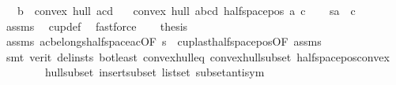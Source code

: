 \begin{isabellebody}
\ \ \ {\isachardoublequoteopen}b\ {\isasymin}\ convex\ hull\ {\isacharbraceleft}{\kern0pt}a{\isacharcomma}{\kern0pt}c{\isacharcomma}{\kern0pt}d{\isacharbraceright}{\kern0pt}{\isachardoublequoteclose}\isanewline
\ \ \ {\isachardoublequoteopen}convex\ hull\ {\isacharbraceleft}{\kern0pt}a{\isacharcomma}{\kern0pt}b{\isacharcomma}{\kern0pt}c{\isacharcomma}{\kern0pt}d{\isacharbraceright}{\kern0pt}{\isasymsubseteq}\ halfspace{\isacharunderscore}{\kern0pt}pos\ a\ c{\isachardoublequoteclose}\isanewline
%
\isadelimproof
%
\endisadelimproof
%
\isatagproof
{}\isamarkupfalse%
{\isacharminus}{\kern0pt}\isanewline
\ \ \isamarkupfalse%
\ s{\isacharunderscore}{\kern0pt}{}{\isacharcolon}{\kern0pt}{\isachardoublequoteopen}a\ {\isasymnoteq}\ c{\isachardoublequoteclose}\ \isamarkupfalse%
\ assms{\isacharparenleft}{\kern0pt}{}{\isacharparenright}{\kern0pt}\ \isamarkupfalse%
\ cup{\isacharunderscore}{\kern0pt}def\ \isamarkupfalse%
\ fastforce\isanewline
\ \ \isamarkupfalse%
\ {\isacharquery}{\kern0pt}thesis\ \isamarkupfalse%
\ assms{\isacharparenleft}{\kern0pt}{}{\isacharparenright}{\kern0pt}\ a{\isacharunderscore}{\kern0pt}c{\isacharunderscore}{\kern0pt}belongs{\isacharunderscore}{\kern0pt}halfspace{\isacharunderscore}{\kern0pt}a{\isacharunderscore}{\kern0pt}c{\isacharbrackleft}{\kern0pt}OF\ s{\isacharunderscore}{\kern0pt}{}{\isacharbrackright}{\kern0pt}\ \ cup{}{\isacharunderscore}{\kern0pt}last{\isacharunderscore}{\kern0pt}halfspace{\isacharunderscore}{\kern0pt}pos{\isacharbrackleft}{\kern0pt}OF\ assms{\isacharparenleft}{\kern0pt}{}{\isacharparenright}{\kern0pt}{\isacharbrackright}{\kern0pt}\isanewline
\ \ \ \ \isamarkupfalse%
\ {\isacharparenleft}{\kern0pt}smt\ {\isacharparenleft}{\kern0pt}verit{\isacharcomma}{\kern0pt}\ del{\isacharunderscore}{\kern0pt}insts{\isacharparenright}{\kern0pt}\ bot{\isacharunderscore}{\kern0pt}least\ convex{\isacharunderscore}{\kern0pt}hull{\isacharunderscore}{\kern0pt}eq\ convex{\isacharunderscore}{\kern0pt}hull{\isacharunderscore}{\kern0pt}subset\ halfspace{\isacharunderscore}{\kern0pt}pos{\isacharunderscore}{\kern0pt}convex\isanewline
\ \ \ \ \ \ \ \ hull{\isacharunderscore}{\kern0pt}subset\ insert{\isacharunderscore}{\kern0pt}subset\ list{\isachardot}{\kern0pt}set{\isacharparenleft}{\kern0pt}{}{\isacharcomma}{\kern0pt}{}{\isacharparenright}{\kern0pt}\ subset{\isacharunderscore}{\kern0pt}antisym{\isacharparenright}{\kern0pt}\isanewline

\end{isabellebody}
